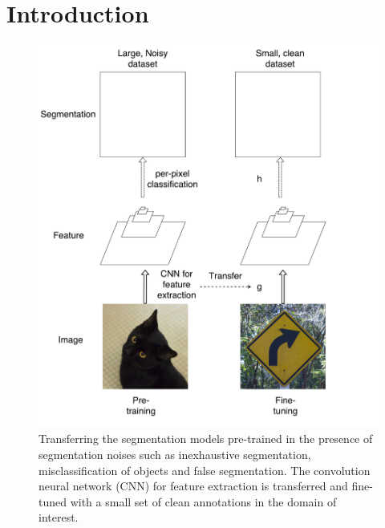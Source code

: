 \section{Introduction}
\label{introduction}




\begin{figure}[t]
\begin{center}
   \includegraphics[width=1.1\linewidth]{img/figure1}
\end{center}
   \caption{
   Transferring the segmentation models pre-trained in the presence of segmentation noises such as inexhaustive segmentation, misclassification of objects and false segmentation.
   The convolution neural network (CNN) for feature extraction is transferred and fine-tuned with a small set of clean annotations in the domain of interest.
   }
\label{fig:long}
\label{fig:onecol}
\end{figure}


